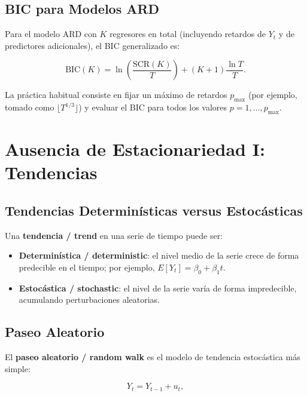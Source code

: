 \documentclass[12pt]{article}
\begin{document}
\subsection{BIC para Modelos ARD}

Para el modelo ARD con $K$ regresores en total (incluyendo retardos de $Y_t$ y de predictores adicionales), el BIC generalizado es:

\begin{equation}
  \text{BIC}(K) = \ln\!\left(\frac{\text{SCR}(K)}{T}\right) + (K+1)\frac{\ln T}{T}.
  \label{eq:bick}
\end{equation}

La pr\'actica habitual consiste en fijar un m\'aximo de retardos $p_{\max}$ (por ejemplo, tomado como $\lfloor T^{1/3} \rfloor$) y evaluar el BIC para todos los valores $p = 1, \ldots, p_{\max}$.

\section{Ausencia de Estacionariedad I: Tendencias}

\subsection{Tendencias Determin\'isticas versus Estoc\'asticas}

Una \textbf{tendencia / trend} en una serie de tiempo puede ser:

\begin{itemize}
  \item \textbf{Determin\'istica / deterministic}: el nivel medio de la serie crece de forma predecible en el tiempo; por ejemplo, $E[Y_t] = \beta_0 + \beta_1 t$.
  \item \textbf{Estoc\'astica / stochastic}: el nivel de la serie var\'ia de forma impredecible, acumulando perturbaciones aleatorias.
\end{itemize}

\subsection{Paseo Aleatorio}

El \textbf{paseo aleatorio / random walk} es el modelo de tendencia estoc\'astica m\'as simple:

\begin{equation}
  Y_t = Y_{t-1} + u_t,
  \label{eq:rw}
\end{equation}
\end{document}
